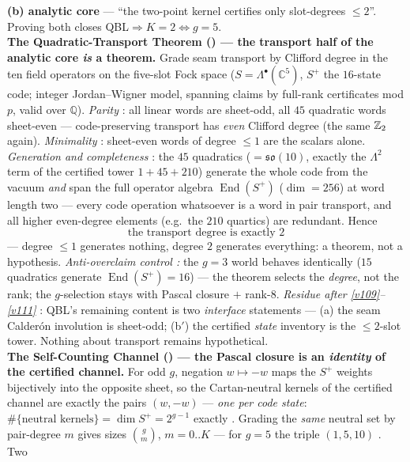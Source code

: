 \begin{keybox}
\textbf{(b) analytic core} --- ``the two-point kernel certifies only slot-degrees $\le2$''. Proving
both closes QBL${}\Rightarrow K{=}2\Leftrightarrow g{=}5$.
\smallskip\\
\noindent\textbf{The Quadratic-Transport Theorem () --- the
transport half of the analytic core \emph{is} a theorem.} Grade seam transport by Clifford degree in
the ten field operators on the five-slot Fock space ($S=\Lambda^\bullet(\mathbb C^5)$, $S^+$ the
$16$-state code; integer Jordan--Wigner model, spanning claims by full-rank certificates mod $p$,
valid over $\mathbb Q$). \emph{Parity} \mE: all linear words are sheet-odd, all $45$ quadratic words
sheet-even --- code-preserving transport has \emph{even} Clifford degree (the same $\mathbb{Z}_2$ again).
\emph{Minimality} \mE: sheet-even words of degree $\le1$ are the scalars alone. \emph{Generation and
completeness} \mE: the $45$ quadratics ($=\mathfrak{so}(10)$, exactly the $\Lambda^2$ term of the
certified tower $1+45+210$) generate the whole code from the vacuum \emph{and} span the full operator
algebra $\operatorname{End}(S^+)$ ($\dim=256$) at word length two --- every code operation whatsoever
is a word in pair transport, and all higher even-degree elements (e.g.\ the $210$ quartics) are
redundant. Hence
\[
  \boxed{\ \text{the transport degree is exactly }2\ }
\]
--- degree $\le1$ generates nothing, degree $2$ generates everything: a theorem, not a hypothesis.
\emph{Anti-overclaim control \mE:} the $g=3$ world behaves identically ($15$ quadratics generate
$\operatorname{End}(S^+)=16$) --- the theorem selects the \emph{degree}, not the rank; the
$g$-selection stays with Pascal closure $+$ rank-$8$. \emph{Residue after \vref{v109}--\vref{v111}} \mC: QBL's
remaining content is two \emph{interface} statements --- (a) the seam Calder\'on involution is
sheet-odd; (b$'$) the certified \emph{state} inventory is the $\le2$-slot tower. Nothing about
transport remains hypothetical.
\smallskip\\
\noindent\textbf{The Self-Counting Channel () --- the Pascal
closure is an \emph{identity} of the certified channel.} For odd $g$, negation $w\mapsto-w$ maps the
$S^+$ weights bijectively into the opposite sheet, so the Cartan-neutral kernels of the certified
channel are exactly the pairs $(w,-w)$ --- \emph{one per code state}:
$\#\{\text{neutral kernels}\}=\dim S^+=2^{g-1}$ exactly \mE. Grading the \emph{same} neutral set by
pair-degree $m$ gives sizes $\binom gm$, $m=0..K$ --- for $g=5$ the triple $(1,5,10)$ \mE. Two

\end{keybox}
